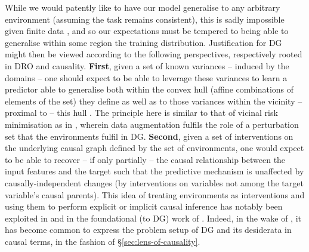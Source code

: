 %
While we would patently like to have our model generalise to any arbitrary environment (assuming
the task remains consistent), this is sadly impossible given finite data
\citep{david2010impossibility}, and so our expectations must be tempered to being able to
generalise within some region the training distribution.
%
%
Justification for \ac{DG} might then be viewed according to the following perspectives,
respectively rooted in \ac{DRO} and causality. \textbf{First}, given a set of known variances --
induced by the domains -- one should expect to be able to leverage these variances to learn a
predictor able to generalise both within the convex hull (affine combinations of elements of the
set) they define as well as to those variances within the vicinity -- proximal to -- this hull
\citep{krueger2021out}.
The principle here is similar to that of vicinal risk minimisation \citep{chapelle2000vicinal} as
in \cite{zhang2017mixup}, wherein data augmentation fulfils the role of a perturbation set that the
environments fulfil in \ac{DG}.
%
\textbf{Second}, given a set of interventions on the underlying causal graph defined by the set of
environments, one would expect to be able to recover -- if only partially -- the causal
relationship between the input features and the target such that the predictive mechanism is
unaffected by causally-independent changes (by interventions on variables not among the target
variable's causal parents).
%
This idea of treating environments as interventions and using them to perform explicit or
implicit causal inference has notably been exploited in \cite{peters2016causal} and in the
foundational (to \ac{DG}) work of \cite{arjovsky2019invariant}.
%
Indeed, in the wake of \cite{arjovsky2019invariant}, it has become common \citep{
gulrajani2020search, krueger2021out, mahajan2021domain, lin2022zin} to express the problem setup of
\ac{DG} and its desiderata in causal terms, in the fashion of \S\ref{sec:lens-of-causality}.
%

